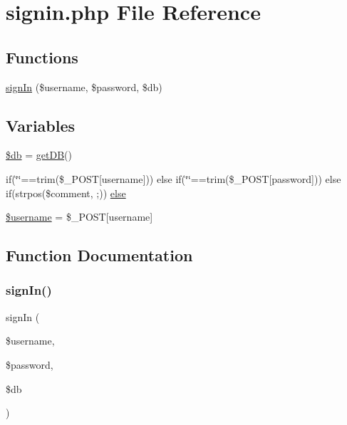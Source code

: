 \hypertarget{signin_8php}{}\section{signin.\+php File Reference}
\label{signin_8php}
\subsection*{Functions}
\begin{DoxyCompactItemize}
\item 
\mbox{\hyperlink{signin_8php_ad5ce5c6e760bcbc1ea7e6be1b673d139}{sign\+In}} (\$username, \$password, \$db)
\end{DoxyCompactItemize}
\subsection*{Variables}
\begin{DoxyCompactItemize}
\item 
\mbox{\hyperlink{signin_8php_a1fa3127fc82f96b1436d871ef02be319}{\$db}} = \mbox{\hyperlink{database_8php_a4162847310de81b83504109485866a7c}{get\+DB}}()
\item 
if(\char`\"{}\char`\"{}==trim(\$\+\_\+\+P\+O\+ST\mbox{[}\textquotesingle{}username\textquotesingle{}\mbox{]})) else if(\char`\"{}\char`\"{}==trim(\$\+\_\+\+P\+O\+ST\mbox{[}\textquotesingle{}password\textquotesingle{}\mbox{]})) else if(strpos(\$comment, \textquotesingle{};\textquotesingle{})) \mbox{\hyperlink{signin_8php_ac7dd3efb1a4048641efb470a5fb24db4}{else}}
\item 
\mbox{\hyperlink{signin_8php_a0eb82aa5f81cf845de4b36cd653c42cf}{\$username}} = \$\+\_\+\+P\+O\+ST\mbox{[}\textquotesingle{}username\textquotesingle{}\mbox{]}
\end{DoxyCompactItemize}


\subsection{Function Documentation}
\mbox{\label{signin_8php_ad5ce5c6e760bcbc1ea7e6be1b673d139}} 
\subsubsection{\texorpdfstring{sign\+In()}{signIn()}}
{\footnotesize\ttfamily sign\+In (\begin{DoxyParamCaption}\item[{}]{\$username,  }\item[{}]{\$password,  }\item[{}]{\$db }\end{DoxyParamCaption})}



